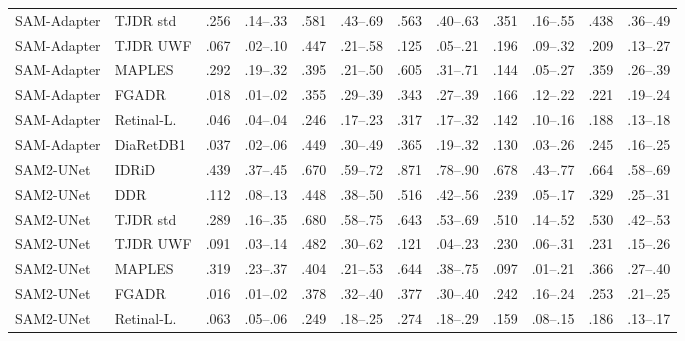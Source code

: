 \begin{landscape}
{\begin{longtable}{l l c c c c c c c c c c}
SAM-Adapter & TJDR std & .256 & \scriptsize .14--.33 & .581 & \scriptsize .43--.69 & .563 & \scriptsize .40--.63 & .351 & \scriptsize .16--.55 & .438 & \scriptsize .36--.49 \\
SAM-Adapter & TJDR UWF & .067 & \scriptsize .02--.10 & .447 & \scriptsize .21--.58 & .125 & \scriptsize .05--.21 & .196 & \scriptsize .09--.32 & .209 & \scriptsize .13--.27 \\
SAM-Adapter & MAPLES & .292 & \scriptsize .19--.32 & .395 & \scriptsize .21--.50 & .605 & \scriptsize .31--.71 & .144 & \scriptsize .05--.27 & .359 & \scriptsize .26--.39 \\
SAM-Adapter & FGADR & .018 & \scriptsize .01--.02 & .355 & \scriptsize .29--.39 & .343 & \scriptsize .27--.39 & .166 & \scriptsize .12--.22 & .221 & \scriptsize .19--.24 \\
SAM-Adapter & Retinal-L. & .046 & \scriptsize .04--.04 & .246 & \scriptsize .17--.23 & .317 & \scriptsize .17--.32 & .142 & \scriptsize .10--.16 & .188 & \scriptsize .13--.18 \\
SAM-Adapter & DiaRetDB1 & .037 & \scriptsize .02--.06 & .449 & \scriptsize .30--.49 & .365 & \scriptsize .19--.32 & .130 & \scriptsize .03--.26 & .245 & \scriptsize .16--.25 \\
SAM2-UNet & IDRiD & .439 & \scriptsize .37--.45 & .670 & \scriptsize .59--.72 & .871 & \scriptsize .78--.90 & .678 & \scriptsize .43--.77 & .664 & \scriptsize .58--.69 \\
SAM2-UNet & DDR & .112 & \scriptsize .08--.13 & .448 & \scriptsize .38--.50 & .516 & \scriptsize .42--.56 & .239 & \scriptsize .05--.17 & .329 & \scriptsize .25--.31 \\
SAM2-UNet & TJDR std & .289 & \scriptsize .16--.35 & .680 & \scriptsize .58--.75 & .643 & \scriptsize .53--.69 & .510 & \scriptsize .14--.52 & .530 & \scriptsize .42--.53 \\
SAM2-UNet & TJDR UWF & .091 & \scriptsize .03--.14 & .482 & \scriptsize .30--.62 & .121 & \scriptsize .04--.23 & .230 & \scriptsize .06--.31 & .231 & \scriptsize .15--.26 \\
SAM2-UNet & MAPLES & .319 & \scriptsize .23--.37 & .404 & \scriptsize .21--.53 & .644 & \scriptsize .38--.75 & .097 & \scriptsize .01--.21 & .366 & \scriptsize .27--.40 \\
SAM2-UNet & FGADR & .016 & \scriptsize .01--.02 & .378 & \scriptsize .32--.40 & .377 & \scriptsize .30--.40 & .242 & \scriptsize .16--.24 & .253 & \scriptsize .21--.25 \\
SAM2-UNet & Retinal-L. & .063 & \scriptsize .05--.06 & .249 & \scriptsize .18--.25 & .274 & \scriptsize .18--.29 & .159 & \scriptsize .08--.15 & .186 & \scriptsize .13--.17 \\

\end{longtable}}
\end{landscape}
